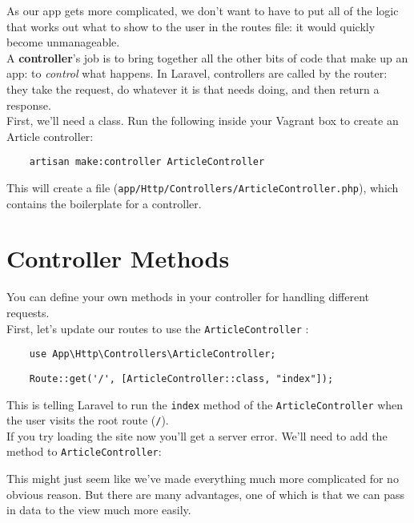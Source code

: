 As our app gets more complicated, we don't want to have to put all of the logic that works out what to show to the user in the routes file: it would quickly become unmanageable.
\\

A \textbf{controller}'s job is to bring together all the other bits of code that make up an app: to \textit{control} what happens. In Laravel, controllers are called by the router: they take the request, do whatever it is that needs doing, and then return a response.
\\

First, we'll need a class. Run the following inside your Vagrant box to create an Article controller:

\begin{verbatim}
    artisan make:controller ArticleController
\end{verbatim}

This will create a file (\texttt{app/Http/Controllers/ArticleController.php}), which contains the boilerplate for a controller.

\section{Controller Methods}

You can define your own methods in your controller for handling different requests.
\\

First, let's update our routes to use the \texttt{ArticleController} :

\begin{verbatim}
    use App\Http\Controllers\ArticleController;
\end{verbatim}

\begin{verbatim}
    Route::get('/', [ArticleController::class, "index"]);
\end{verbatim}

This is telling Laravel to run the \texttt{index} method of the \texttt{ArticleController} when the user visits the root route (\texttt{/}).
\\

If you try loading the site now you'll get a server error. We'll need to add the method to \texttt{ArticleController}:


This might just seem like we've made everything much more complicated for no obvious reason. But there are many advantages, one of which is that we can pass in data to the view much more easily.
\\


